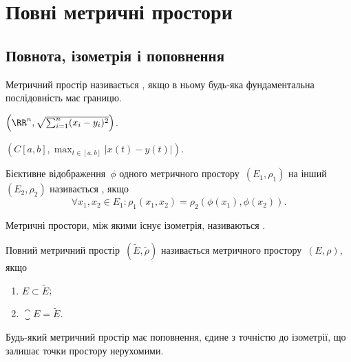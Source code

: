 \chapter{Повні метричні простори}

\section{Повнота, ізометрія і поповнення}

\begin{definition}
Метричний простір називається , якщо
в ньому будь-яка фундаментальна послідовність має
границю.
\end{definition}

\begin{example}
$\left( \RR^n, \sqrt{\sum_{i = 1}^n (x_i - y_i)^2} \right)$.
\end{example}

\begin{example}
$\left( C[a, b], \max_{t \in [a, b]} |x(t) - y(t)| \right)$.
\end{example}

\begin{definition}
Бієктивне відображення~$\phi$ одного метричного
простору~$(E_1, \rho_1)$ на інший~$(E_2, \rho_2)$ називається
, якщо
\begin{equation*}
    \forall x_1, x_2 \in E_1: \rho_1(x_1, x_2) = \rho_2(\phi(x_1), \phi(x_2)).
\end{equation*}
\end{definition}

\begin{definition}
Метричні простори, між якими існує
ізометрія, називаються .
\end{definition}

\begin{definition}
Повний метричний простір~$(\tilde E, \tilde \rho)$ називається
 метричного простору~$(E, \rho)$, якщо
\begin{enumerate}
    \item $E \subset \tilde E$;
    \item $\closure E = \tilde{E}$.
\end{enumerate}
\end{definition}

\begin{theorem}
Будь-який метричний простір має поповнення,
єдине з точністю до ізометрії, що залишає точки простору
нерухомими.
\end{theorem}

